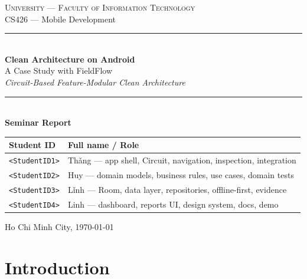 \documentclass[11pt,a4paper]{article}
\begin{document}
\begin{titlepage}
\centering
\vspace*{1.5cm}

{\large\scshape University --- Faculty of Information Technology}\\[0.3cm]
{\large CS426 --- Mobile Development}\\[2.0cm]

\rule{\linewidth}{0.5pt}\\[0.5cm]
{\Huge\bfseries Clean Architecture on Android}\\[0.5cm]
{\LARGE A Case Study with FieldFlow}\\[0.4cm]
{\large\itshape Circuit-Based Feature-Modular Clean Architecture}\\[0.3cm]
\rule{\linewidth}{0.5pt}\\[2.0cm]

{\large\bfseries Seminar Report}\\[1.5cm]

\begin{tabular}{ll}
\toprule
\textbf{Student ID} & \textbf{Full name / Role} \\
\midrule
\texttt{<StudentID1>} & Th\v{a}ng --- app shell, Circuit, navigation, inspection, integration \\
\texttt{<StudentID2>} & Huy --- domain models, business rules, use cases, domain tests \\
\texttt{<StudentID3>} & L\v{i}nh --- Room, data layer, repositories, offline-first, evidence \\
\texttt{<StudentID4>} & Linh --- dashboard, reports UI, design system, docs, demo \\
\bottomrule
\end{tabular}

\vfill
{\large Ho Chi Minh City, \today}
\end{titlepage}

\tableofcontents
\newpage

\section{Introduction}
\end{document}
